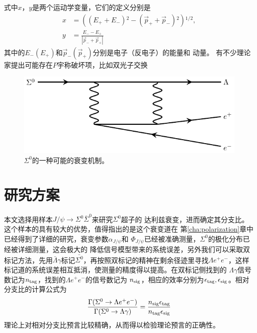 式中$x$，$y$是两个运动学变量，它们的定义分别是
\begin{equation}
    \begin{aligned}
        \label{eq:def-x-y}
        x &= \left((E_{+} + E_{-}){}^{2} - (\vec{p}_{+} + \vec{p}_{-}){}^{2}
        \right){}^{1/2},\\
        y &= \frac{E_{-} - E_{+}}{|\vec{p}_{-} + \vec{p}_{+}|}  
    \end{aligned} 
\end{equation}
其中的$E_{-}(E_{+})$和$\vec{p}_{-}(\vec{p}_{+})$分别是电子（反电子）的能量和
动量。
有不少理论家提出可能存在$P$宇称破坏项，比如双光子交换
\begin{figure}[htpb]
    \centering
    \includegraphics[width=0.8\linewidth]{figures/Sigma/intr/neu_eeL.pdf}
    \caption{$\Sigma^{0}$的一种可能的衰变机制。}%
    \label{fig:TGE}
\end{figure}

\section{研究方案}
本文选择用样本$J/\psi \to \Sigma^{0} \bar{\Sigma}^{0}$来研究$\Sigma^{0}$超子的
达利兹衰变，进而确定其分支比。这个样本的具有较大的优势，值得指出的是这个衰变道在
第\ref{cha:polarization}章中已经得到了详细的研究，衰变参数$\alpha_{J/\psi}$和
$\Phi_{J/\psi}$已经被准确测量，$\Sigma^{0}$的极化分布已经被详细测量，这会极大的
降低信号模型带来的系统误差，另外我们可以采取双标记方法，先用$\bar{\Lambda}
\gamma$标记$\bar{\Sigma^{0}}$，再按照双标记的精神在剩余径迹里寻找$\Lambda e^{+}
e^{-}$，这样标记道的系统误差相互抵消，使测量的精度得以提高。在双标记侧找到的
$\Lambda \gamma$信号数记为$n_{\rm tag}$，找到的$\Lambda e^{+} e^{-}$的信号数记为
$n_{\rm sig}$，相应的效率分别为$\epsilon_{\rm tag}, \epsilon_{\rm sig}$。相对
分支比的计算公式为
\begin{equation}
    \label{eq:cal-dalitz-BF}
    \frac{\Gamma(\Sigma^{0} \to \Lambda e^{+} e^{-})}
    {\Gamma(\Sigma^{0} \to \Lambda \gamma)}
    =  \frac{n_{\rm sig} \epsilon_{\rm tag}}{n_{\rm tag} \epsilon_{\rm sig}}
\end{equation}
理论上对相对分支比预言比较精确，从而得以检验理论预言的正确性。

